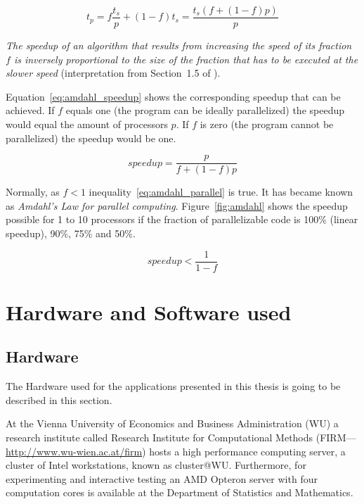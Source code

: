 \begin{equation}
\label{eq:t_amdahl}
t_p = f \frac{t_s}{p} + (1 - f) t_s = \frac{t_s ( f + ( 1 - f) p )}{p}
\end{equation}

\textit{The speedup of an algorithm that results from increasing the speed of
its fraction $f$ is inversely proportional to the size of the fraction
that has to be executed at the slower speed} (interpretation from
Section~1.5 of \cite{kontoghiorghes06handbookpcstat}).

Equation~\ref{eq:amdahl_speedup} shows the corresponding speedup that
can be achieved. If $f$ equals one (the program can be ideally
parallelized) the speedup would equal the amount of processors $p$. If
$f$ is zero (the program cannot be parallelized) the speedup would be
one. 

\begin{equation}
\label{eq:amdahl_speedup}
speedup = \frac{p}{f + (1 - f)p}
\end{equation}

Normally, as $f < 1$ inequality~\ref{eq:amdahl_parallel} is true. It
has became known as \textit{Amdahl's Law for parallel
  computing}. Figure~\ref{fig:amdahl} shows the speedup possible for 1
to 10 processors if
the fraction of parallelizable code is 100\% (linear speedup), 90\%,
75\% and 50\%.

\begin{equation}
\label{eq:amdahl_parallel}
speedup < \frac{1}{1 - f}
\end{equation}





\section{Hardware and Software used}
\label{sec:hardwaresoftware}

\subsection{Hardware}
The Hardware used for the applications presented in this thesis is
going to be described in this section.

At the Vienna University of Economics and Business Administration (WU)
a research institute called Research Institute for Computational
Methods (FIRM---\url{http://www.wu-wien.ac.at/firm}) hosts a high
performance computing server, a cluster of Intel workstations, known
as cluster@WU.
Furthermore, for experimenting and interactive testing an AMD Opteron
server with four computation cores is available at the
Department of Statistics and Mathematics. 

